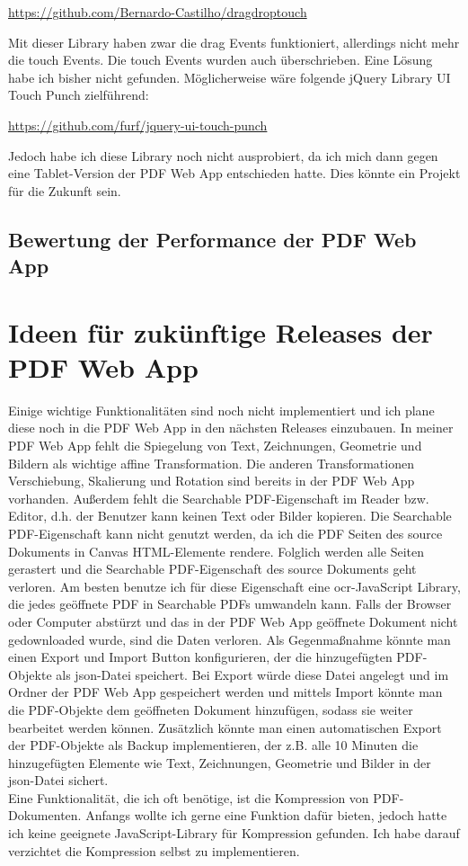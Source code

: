 \url{https://github.com/Bernardo-Castilho/dragdroptouch}

Mit dieser Library haben zwar die drag Events funktioniert, allerdings nicht mehr die touch Events. Die touch Events wurden auch überschrieben. Eine Lösung habe ich bisher nicht gefunden. Möglicherweise wäre folgende jQuery Library UI Touch Punch zielführend:

\url{https://github.com/furf/jquery-ui-touch-punch}

Jedoch habe ich diese Library noch nicht ausprobiert, da ich mich dann gegen eine Tablet-Version der PDF Web App entschieden hatte. Dies könnte ein Projekt für die Zukunft sein.


\subsection{Bewertung der Performance der PDF Web App}


\section{Ideen für zukünftige Releases der PDF Web App}
Einige wichtige Funktionalitäten sind noch nicht implementiert und ich plane diese noch in die PDF Web App in den nächsten Releases einzubauen. In meiner PDF Web App fehlt die Spiegelung von Text, Zeichnungen, Geometrie und Bildern als wichtige affine Transformation. Die anderen Transformationen Verschiebung, Skalierung und Rotation sind bereits in der PDF Web App vorhanden. Außerdem fehlt die Searchable PDF-Eigenschaft im Reader bzw. Editor, d.h. der Benutzer kann keinen Text oder Bilder kopieren. Die Searchable PDF-Eigenschaft kann nicht genutzt werden, da ich die PDF Seiten des source Dokuments in Canvas HTML-Elemente rendere. Folglich werden alle Seiten gerastert und die Searchable PDF-Eigenschaft des source Dokuments geht verloren. Am besten benutze ich für diese Eigenschaft eine \gls{ocr}-JavaScript Library, die jedes geöffnete PDF in Searchable PDFs umwandeln kann. Falls der Browser oder Computer abstürzt und das in der PDF Web App geöffnete Dokument nicht gedownloaded wurde, sind die Daten verloren. Als Gegenmaßnahme könnte man einen Export und Import Button konfigurieren, der die hinzugefügten PDF-Objekte als \gls{json}-Datei speichert. Bei Export würde diese Datei angelegt und im Ordner der PDF Web App gespeichert werden und mittels Import könnte man die PDF-Objekte dem geöffneten Dokument hinzufügen, sodass sie weiter bearbeitet werden können. Zusätzlich könnte man einen automatischen Export der PDF-Objekte als Backup implementieren, der z.B. alle 10 Minuten die hinzugefügten Elemente wie Text, Zeichnungen, Geometrie und Bilder in der \gls{json}-Datei sichert. \\
Eine Funktionalität, die ich oft benötige, ist die Kompression von PDF-Dokumenten. Anfangs wollte ich gerne eine Funktion dafür bieten, jedoch hatte ich keine geeignete JavaScript-Library für Kompression gefunden. Ich habe darauf verzichtet die Kompression selbst zu implementieren. \\